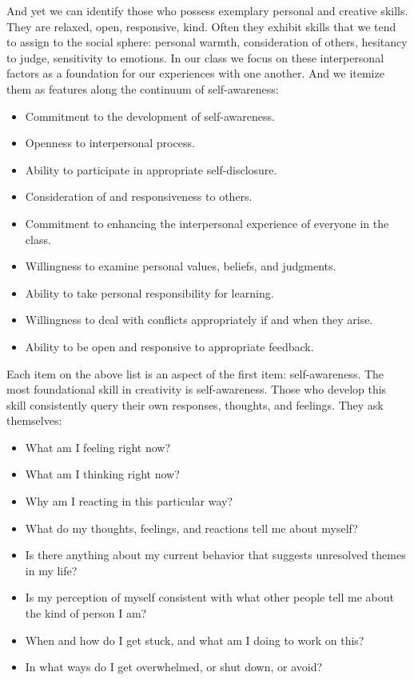 \documentclass[letterpaper,10pt,headsepline]{scrreprt}
\begin{document}
And yet we can identify those who possess exemplary personal and creative skills. They are relaxed, open, responsive, kind. Often they exhibit skills that we tend to assign to the social sphere: personal warmth, consideration of others, hesitancy to judge, sensitivity to emotions. In our class we focus on these interpersonal factors as a foundation for our experiences with one another. And we itemize them as features along the continuum of self-awareness:

\begin{itemize}
\item Commitment to the development of self-awareness.
\item Openness to interpersonal process.
\item Ability to participate in appropriate self-disclosure.
\item Consideration of and responsiveness to others.
\item Commitment to enhancing the interpersonal experience of everyone in the class.
\item Willingness to examine personal values, beliefs, and judgments.
\item Ability to take personal responsibility for learning.
\item Willingness to deal with conflicts appropriately if and when they arise.
\item Ability to be open and responsive to appropriate feedback.
\end{itemize}

Each item on the above list is an aspect of the first item: self-awareness. The most foundational skill in creativity is self-awareness. Those who develop this skill consistently query their own responses, thoughts, and feelings. They ask themselves:

\begin{itemize}
\item What am I feeling right now?
\item What am I thinking right now?
\item Why am I reacting in this particular way?
\item What do my thoughts, feelings, and reactions tell me about myself?
\item Is there anything about my current behavior that suggests unresolved themes in my life?
\item Is my perception of myself consistent with what other people tell me about the kind of person I am?
\item When and how do I get stuck, and what am I doing to work on this?
\item In what ways do I get overwhelmed, or shut down, or avoid?
 
\end{itemize}
\end{document}
